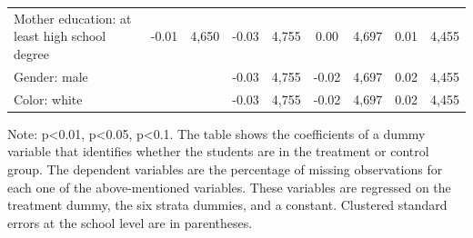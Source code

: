 \documentclass[
	article,			%
	12pt,				%
	oneside,			%
	a4paper,			%
	]{article}
\begin{document}
\begin{table}[htbp]
\begin{threeparttable}
\begin{tabular}{lcccccccc}
Mother education: at least high school degree &      -0.01 &      4,650 &      -0.03 &      4,755 &       0.00 &      4,697 &       0.01 &      4,455 \\

Gender: male &            &            &      -0.03 &      4,755 &      -0.02 &      4,697 &       0.02 &      4,455 \\

Color:  white &            &            &      -0.03 &      4,755 &      -0.02 &      4,697 &       0.02 &      4,455 \\

\hline
\hline
\end{tabular}  
\label{tab:reg_on_missing}%
\begin{tablenotes}
   \fontsize{9}{9}\selectfont 
    \item 
    Note:  p<0.01,  p<0.05,  p<0.1. The table shows the coefficients of a dummy variable that identifies whether the students are in the treatment or control group. The dependent variables are the percentage of missing observations for each one of the above-mentioned variables. 
These variables are regressed on the treatment dummy, the six strata dummies, and a constant. Clustered standard errors at the school level are in parentheses.    
    \end{tablenotes}
     \end{threeparttable}
\end{table}%
\end{document}
